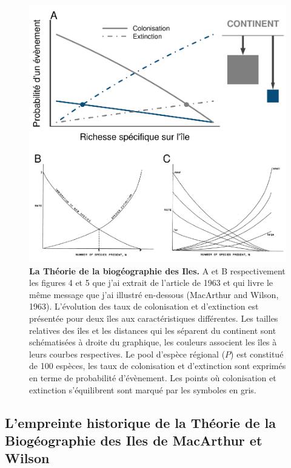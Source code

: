 \begin{figure}[htbp]
\centering
\includegraphics{fig/fig1.pdf}
\caption{\textbf{La Théorie de la biogéographie des Iles.} A et B
respectivement les figures 4 et 5 que j'ai extrait de l'article de 1963
et qui livre le même message que j'ai illustré en-dessous (MacArthur and
Wilson, 1963). L'évolution des taux de colonisation et d'extinction est
présentée pour deux îles aux caractéristiques différentes. Les tailles
relatives des îles et les distances qui les séparent du continent sont
schématisées à droite du graphique, les couleurs associent les îles à
leurs courbes respectives. Le pool d'espèce régional (\(P\)) est
constitué de 100 espèces, les taux de colonisation et d'extinction sont
exprimés en terme de probabilité d'évènement. Les points où colonisation
et extinction s'équilibrent sont marqué par les symboles en
gris.\label{fig:figMW}}
\end{figure}

\subsection*{L'empreinte historique de la Théorie de la Biogéographie
des Iles de MacArthur et
Wilson}\label{lempreinte-historique-de-la-thuxe9orie-de-la-bioguxe9ographie-des-iles-de-macarthur-et-wilson}

